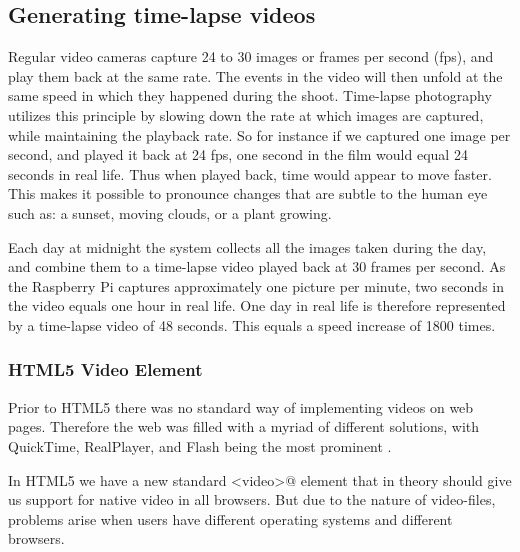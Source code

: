 \subsection{Generating time-lapse videos}
Regular video cameras capture 24 to 30 images or frames per second (fps), and play them back at the same rate. The events in the video will then unfold at the same speed in which they happened during the shoot. Time-lapse photography utilizes this principle by slowing down the rate at which images are captured, while maintaining the playback rate. So for instance if we captured one image per second, and played it back at 24 fps, one second in the film would equal 24 seconds in real life. Thus when played back, time would appear to move faster. This makes it possible to pronounce changes that are subtle to the human eye such as: a sunset, moving clouds, or a plant growing.  

Each day at midnight the system collects all the images taken during the day, and combine them to a time-lapse video played back at 30 frames per second. As the Raspberry Pi captures approximately one picture per minute, two seconds in the video equals one hour in real life. One day in real life is therefore represented by a time-lapse video of 48 seconds. This equals a speed increase of 1800 times. 


\subsubsection{HTML5 Video Element}
Prior to HTML5 there was no standard way of implementing videos on web pages. Therefore the web was filled with a myriad of different solutions, with QuickTime, RealPlayer, and Flash being the most prominent \citep{pilgrim2010html5}.

In HTML5 we have a new standard \verb@<video>@ element that in theory should give us support for native video in all browsers. But due to the nature of video-files, problems arise when users have different operating systems and different browsers. 

